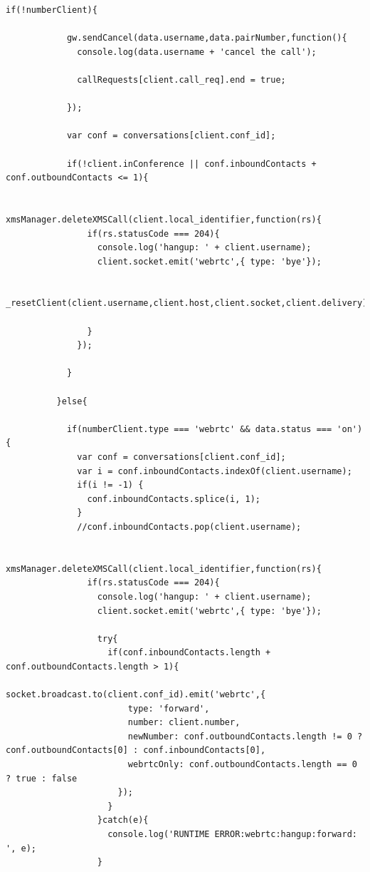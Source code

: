 \begin{appendices}
\begin{lstlisting}[caption={socket.js on Application Server},label={code:server_socket}]
          if(!numberClient){

            gw.sendCancel(data.username,data.pairNumber,function(){
              console.log(data.username + 'cancel the call');

              callRequests[client.call_req].end = true;

            });

            var conf = conversations[client.conf_id];

            if(!client.inConference || conf.inboundContacts + conf.outboundContacts <= 1){

              xmsManager.deleteXMSCall(client.local_identifier,function(rs){
                if(rs.statusCode === 204){
                  console.log('hangup: ' + client.username);
                  client.socket.emit('webrtc',{ type: 'bye'});
                  
                  _resetClient(client.username,client.host,client.socket,client.delivery);
                  
                }
              });

            }

          }else{

            if(numberClient.type === 'webrtc' && data.status === 'on'){
              var conf = conversations[client.conf_id];
              var i = conf.inboundContacts.indexOf(client.username);
              if(i != -1) {
                conf.inboundContacts.splice(i, 1);
              }
              //conf.inboundContacts.pop(client.username);

              xmsManager.deleteXMSCall(client.local_identifier,function(rs){
                if(rs.statusCode === 204){
                  console.log('hangup: ' + client.username);
                  client.socket.emit('webrtc',{ type: 'bye'});

                  try{
                    if(conf.inboundContacts.length + conf.outboundContacts.length > 1){
                      socket.broadcast.to(client.conf_id).emit('webrtc',{
                        type: 'forward',
                        number: client.number,
                        newNumber: conf.outboundContacts.length != 0 ? conf.outboundContacts[0] : conf.inboundContacts[0],
                        webrtcOnly: conf.outboundContacts.length == 0 ? true : false
                      });
                    }
                  }catch(e){
                    console.log('RUNTIME ERROR:webrtc:hangup:forward: ', e);
                  }
                  

\end{lstlisting}
\end{appendices}
